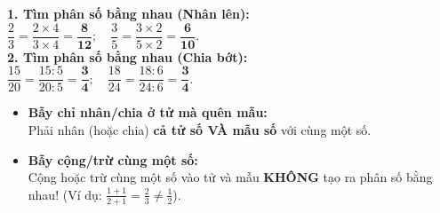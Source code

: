 \documentclass[14pt,a4paper,oneside]{extbook}
\begin{document}
\vspace{-2.5mm}
\noindent
\begin{minipage}[t]{0.49\textwidth}\vspace{0pt}
\begin{tcolorbox}[
  enhanced,
  colback=green!4!white,
  colframe=green!60!black,
  arc=2mm, boxrule=0.8pt,
  left=2mm, right=2mm, top=1.8mm, bottom=1.8mm,
  title={\footnotesize\bfseries\color{white}\faCheckCircle\ Ví dụ thực hành chuẩn mực}
]
{\footnotesize
\textbf{1. Tìm phân số bằng nhau (Nhân lên):}\\
$\dfrac{2}{3} = \dfrac{2 \times 4}{3 \times 4} = \mathbf{\dfrac{8}{12}}; \quad \dfrac{3}{5} = \dfrac{3 \times 2}{5 \times 2} = \mathbf{\dfrac{6}{10}}$.\\
\textbf{2. Tìm phân số bằng nhau (Chia bớt):}\\
$\dfrac{15}{20} = \dfrac{15 : 5}{20 : 5} = \mathbf{\dfrac{3}{4}}; \quad \dfrac{18}{24} = \dfrac{18 : 6}{24 : 6} = \mathbf{\dfrac{3}{4}}$.
}
\end{tcolorbox}
\end{minipage}
\hfill
\begin{minipage}[t]{0.49\textwidth}\vspace{0pt}
\begin{tcolorbox}[
  enhanced,
  colback=red!4!white,
  colframe=red!70!black,
  arc=2mm, boxrule=0.8pt,
  left=2mm, right=2mm, top=1.8mm, bottom=1.8mm,
  title={\footnotesize\bfseries\color{white}\faExclamationTriangle\ Mẹo tránh bẫy trắc nghiệm}
]
{\footnotesize
\begin{itemize}\setlength{\itemsep}{1.5pt}\setlength{\leftskip}{-2.5mm}
  \item \textbf{Bẫy chỉ nhân/chia ở tử mà quên mẫu:}\\
  Phải nhân (hoặc chia) \textbf{cả tử số VÀ mẫu số} với cùng một số.
  \item \textbf{Bẫy cộng/trừ cùng một số:}\\
  Cộng hoặc trừ cùng một số vào tử và mẫu \textbf{KHÔNG} tạo ra phân số bằng nhau! (Ví dụ: $\frac{1+1}{2+1} = \frac{2}{3} \ne \frac{1}{2}$).
\end{itemize}
}
\end{tcolorbox}
\end{minipage}
\end{document}
